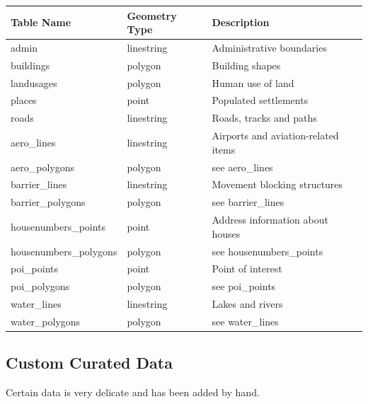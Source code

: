 \begin{center}
    \begin{tabular}{lll}
    \hline
    Table Name            & Geometry Type & Description \\
    \hline                                          
    admin                  & linestring    & Administrative boundaries \\
    buildings              & polygon       & Building shapes                            \\
    landusages             & polygon       & Human use of land \\
    places                 & point         & Populated settlements                      \\
    roads                  & linestring    & Roads, tracks and paths          \\
    aero\_lines            & linestring    & Airports and aviation-related items        \\
    aero\_polygons         & polygon       & see aero\_lines                            \\
    barrier\_lines         & linestring    & Movement blocking structures   \\
    barrier\_polygons      & polygon       & see barrier\_lines                         \\
    housenumbers\_points   & point         & Address information about houses \\
    housenumbers\_polygons & polygon       & see housenumbers\_points                   \\
    poi\_points            & point         & Point of interest                          \\
    poi\_polygons          & polygon       & see poi\_points                            \\
    water\_lines           & linestring    & Lakes and rivers                           \\
    water\_polygons        & polygon       & see water\_lines                           \\
    \end{tabular}
\end{center}

\subsection{Custom Curated Data}

Certain data is very delicate and has been added by hand.

